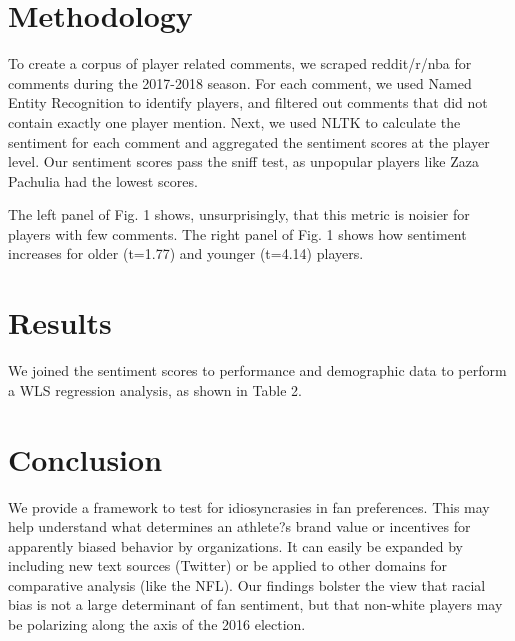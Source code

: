 \documentclass[11pt]{article}
\theoremstyle{definition}
\numberwithin{remark}{section}
\numberwithin{equation}{section}
\numberwithin{theorem}{section}
\renewcommand{\(}{\left(}
\renewcommand{\)}{\right)}
\renewcommand{\(}{\left(}
\renewcommand{\)}{\right)}
\renewcommand{\[}{\left[}
\renewcommand{\]}{\right]}
\begin{document}
\section{Methodology}

To create a corpus of player related comments, we scraped reddit/r/nba for comments during the 2017-2018 season. For each comment, we used Named Entity Recognition to identify players, and filtered out comments that did not contain exactly one player mention. Next, we used NLTK to calculate the sentiment for each comment  and aggregated the sentiment scores at the player level. Our sentiment scores pass the sniff test, as unpopular players like Zaza Pachulia had the lowest scores.

The left panel of Fig. 1 shows, unsurprisingly, that this metric is noisier for players with few comments. The right panel of Fig. 1 shows how sentiment increases for older (t=1.77) and younger (t=4.14) players.

\section{Results}

We joined the sentiment scores to performance and demographic data to perform a WLS regression analysis, as shown in Table 2. 

\section{Conclusion}

We provide a framework to test for idiosyncrasies in fan preferences. This may help understand what determines an athlete?s brand value or incentives for apparently biased behavior by organizations. It can easily be expanded by including new text sources (Twitter) or be applied to other domains for comparative analysis (like the NFL). Our findings bolster the view that racial bias is not a large determinant of fan sentiment, but that non-white players may be polarizing along the axis of the 2016 election.
\end{document}
